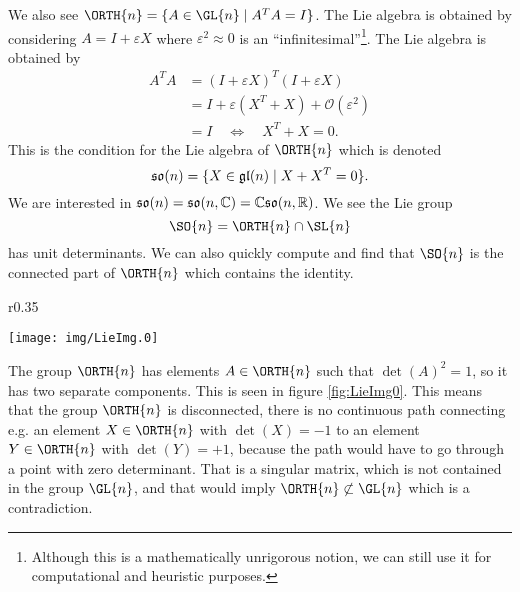 We also see $\ORTH{n}=\{A\in\GL{n}\mid A^{T}A=I\}$. The Lie algebra
is obtained by considering $A=I+\varepsilon X$ where
$\varepsilon^{2}\approx 0$ is an
``infinitesimal''\footnote{Although this is a mathematically
  unrigorous notion, we can still use it for computational and
  heuristic purposes.}. The Lie algebra is obtained by
\begin{subequations}
\begin{align}
A^{T}A &= (I+\varepsilon X)^{T}(I+\varepsilon X)\\
&= I +\varepsilon(X^{T}+X)+\mathcal{O}(\varepsilon^2)\\
&= I\quad\iff\quad X^{T}+X=0.
\end{align}
\end{subequations}
This is the condition for the Lie algebra of $\ORTH{n}$ which is denoted
\begin{equation}
\frak{so}(n)=\{X\in\frak{gl}(n)\mid X+X^{T}=0\}.
\end{equation}
We are interested in
$\frak{so}(n)=\frak{so}(n,\Bbb{C})=\Bbb{C}\frak{so}(n,\Bbb{R})$. We
see the Lie group
\begin{equation}
\SO{n}=\ORTH{n}\cap\SL{n}
\end{equation}
has unit determinants. We can also quickly compute and find that
$\SO{n}$ is the connected part of $\ORTH{n}$ which contains the identity.

\begin{wrapfigure}[12]{r}{0.35\textwidth}
  \vspace{-30pt}
  \begin{center}
    \texttt{[image: img/LieImg.0]}
  \end{center}
  \vspace{-20pt}
  \caption{{\small The Two Seperated Components of O$(n)$.}}\label{fig:LieImg0}
  \vspace{20pt}
\end{wrapfigure}

The group $\ORTH{n}$ has elements $A\in\ORTH{n}$ such that
$\det(A)^{2}=1$, so it has two separate components. This is seen
in figure \ref{fig:LieImg0}. This means that the group $\ORTH{n}$ is
disconnected, there is no continuous path connecting e.g. an
element $X\in\ORTH{n}$ with $\det(X)=-1$ to an element $Y\in\ORTH{n}$
with $\det(Y)=+1$, because the path would have to go through a
point with zero determinant. That is a singular matrix, which is
not contained in the group $\GL{n}$, and that would imply
$\ORTH{n}\not\subset\GL{n}$ which is a contradiction.

